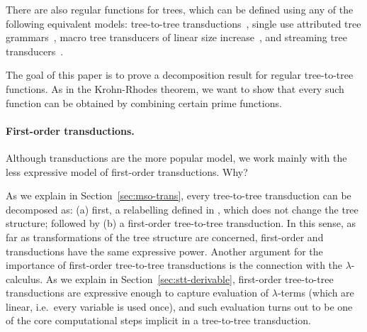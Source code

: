 There are also regular functions for trees, which can be defined using any of the following equivalent models: \mso tree-to-tree transductions~\cite[Section 3]{bloem_comparison_2000}, single use attributed tree grammars~\cite{bloem_comparison_2000}, macro tree transducers of linear size increase~\cite[Theorem 7.1]{engelfriet_macro_2003}, and streaming tree transducers~\cite[Theorem 4.6]{alur2017streaming}. 

The goal of this paper is to prove a decomposition result for regular tree-to-tree functions. As in the Krohn-Rhodes theorem, we want to show that every such function can be obtained by combining certain prime functions.  

\paragraph*{First-order transductions. } Although \mso transductions are the more popular model, we work mainly with the less expressive model of first-order transductions. Why?

As we explain in Section~\ref{sec:mso-trans}, every \mso tree-to-tree transduction can be decomposed as: (a) first, a relabelling defined in \mso, which does not change the tree structure; followed by (b) a first-order tree-to-tree transduction. In this sense, as far as transformations of the tree structure are concerned,  first-order and \mso transductions have the same expressive power. Another argument for the importance of first-order tree-to-tree transductions is the connection with the $\lambda$-calculus. As we explain in Section~\ref{sec:stt-derivable}, first-order tree-to-tree transductions are expressive enough to capture evaluation of $\lambda$-terms (which are linear, i.e.~every variable is used once), and such evaluation turns out to be one of the core computational steps implicit in a tree-to-tree transduction. 


